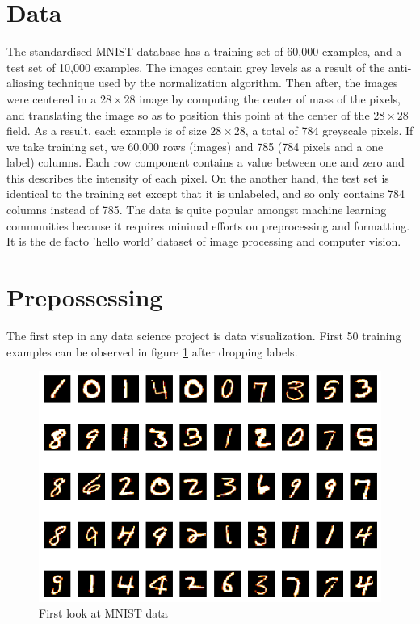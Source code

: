 \section{Data}
\label{C4:data}

The standardised MNIST database has a training set of 60,000 examples, and a test set of 10,000 examples. The images contain grey levels as a result of the anti-aliasing technique used by the normalization algorithm. Then after, the images were centered in a $28\times28$ image by computing the center of mass of the pixels, and translating the image so as to position this point at the center of the $28\times28$ field. As a result, each example is of size $28\times28$, a total of 784 greyscale pixels. If we take training set, we  60,000 rows (images) and 785 (784 pixels and a one label) columns. Each row component contains a value between one and zero and this describes the intensity of each pixel. On the another hand, the test set is identical to the training set except that it is unlabeled, and so only contains 784 columns instead of 785.  The data is quite popular amongst machine learning communities because it requires minimal efforts on preprocessing and formatting. It is the de facto 'hello world' dataset of image processing and computer vision. 

\section{Prepossessing}
\label{C4:prepos}
The first step in any data science project is data visualization. First 50 training examples can be observed in figure \ref{4_1} after dropping labels.

\begin{figure}[h!]
\begin{center}
\includegraphics[width=\textwidth]{./Figures/4_1.png}
\caption {First look at MNIST data}
\label{4_1} 
\end{center}
\end{figure}

